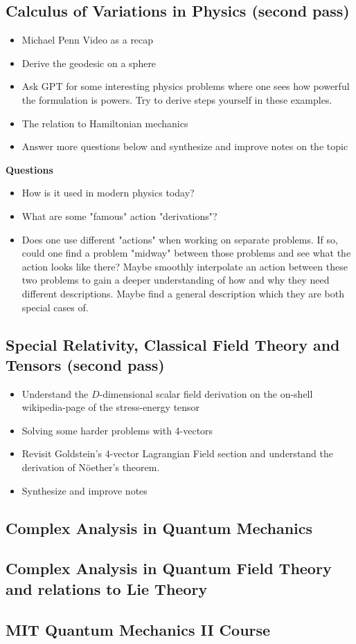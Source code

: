 \subsection*{Calculus of Variations in Physics (second pass)}   
\begin{itemize}
    \item Michael Penn Video as a recap
    \item Derive the geodesic on a sphere 
    \item Ask GPT for some interesting physics problems where one sees how powerful the formulation is powers. Try to derive steps yourself in these examples.
    \item The relation to Hamiltonian mechanics
    \item Answer more questions below and synthesize and improve notes on the topic
\end{itemize}
\textbf{Questions}
\begin{itemize}
    \item How is it used in modern physics today?
    \item What are some "famous" action "derivations"?
    \item Does one use different "actions" when working on separate problems. If so, could one find a problem "midway" between those problems and see what the action looks like there? Maybe smoothly interpolate an action between these two problems to gain a deeper understanding of how and why they need different descriptions. Maybe find a general description which they are both special cases of. 
\end{itemize} 
\subsection*{Special Relativity, Classical Field Theory and Tensors (second pass)}
\begin{itemize}
    \item Understand the \(D\)-dimensional scalar field derivation on the on-shell wikipedia-page of the stress-energy tensor
    \item Solving some harder problems with 4-vectors
    \item Revisit Goldstein's 4-vector Lagrangian Field section and understand the derivation of Nöether's theorem.
    \item Synthesize and improve notes
\end{itemize}
\subsection*{Complex Analysis in Quantum Mechanics}
\subsection*{Complex Analysis in Quantum Field Theory and relations to Lie Theory}
\subsection*{MIT Quantum Mechanics II Course}